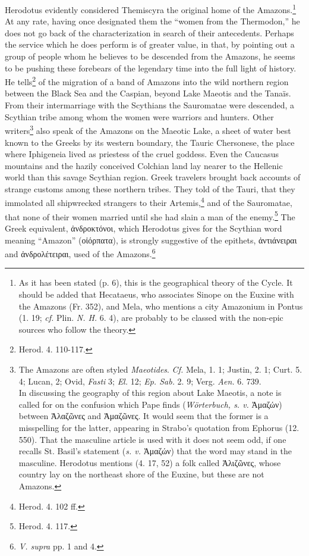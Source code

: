\documentclass[a4paper, 12pt, oneside]{article}
\begin{document}
Herodotus evidently considered Themiscyra the original home of the Amazons.\footnote{As it has been stated (p. 6), this is the geographical theory of the Cycle. It should be added that Hecataeus, who associates Sinope on the Euxine with the Amazons (Fr. 352), and Mela, who mentions a city Amazonium in Pontus (1. 19; \emph{cf.} Plin. \emph{N. H.} 6. 4), are probably to be classed with the non-epic sources who follow the theory.} At any rate, having once designated them the ``women from the Thermodon,'' he does not go back of the characterization in search of their antecedents. Perhaps the service which he does perform is of greater value, in that, by pointing out a group of people whom he believes to be descended from the Amazons, he seems to be pushing these forebears of the legendary time into the full light of history. He tells\footnote{Herod. 4. 110-117.} of the migration of a band of Amazons into the wild northern region between the Black Sea and the Caspian, beyond Lake Maeotis and the Tanaïs. From their intermarriage with the Scythians the Sauromatae were descended, a Scythian tribe among whom the women were warriors and hunters. Other writers\footnote{The Amazons are often styled \emph{Maeotides}. \emph{Cf.} Mela, 1. 1; Justin, 2. 1; Curt. 5. 4; Lucan, 2; Ovid, \emph{Fasti} 3; \emph{El.} 12; \emph{Ep. Sab.} 2. 9; Verg. \emph{Aen.} 6. 739.\\\hspace*{5mm}In discussing the geography of this region about Lake Maeotis, a note is called for on the confusion which Pape finds (\emph{Wörterbuch, s. v.} Ἀμαζών) between Ἀλαζῶνες and Ἀμαζῶνες. It would seem that the former is a misspelling for the latter, appearing in Strabo's quotation from Ephorus (12. 550). That the masculine article is used with it does not seem odd, if one recalls St. Basil's statement (\emph{s. v.} Ἀμαζών) that the word may stand in the masculine. Herodotus mentions (4. 17, 52) a folk called Ἀλιζῶνες, whose country lay on the northeast shore of the Euxine, but these are not Amazons.} also speak of the Amazons on the Maeotic Lake, a sheet of water best known to the Greeks by its western boundary, the Tauric Chersonese, the place where Iphigeneia lived as priestess of the cruel goddess. Even the Caucasus mountains and the hazily conceived Colchian land lay nearer to the Hellenic world than this savage Scythian region. Greek travelers brought back accounts of strange customs among these northern tribes. They told of the Tauri, that they immolated all shipwrecked strangers to their Artemis,\footnote{Herod. 4. 102 ff.} and of the Sauromatae, that none of their women married until she had slain a man of the enemy.\footnote{Herod. 4. 117.} The Greek equivalent, ἀνδροκτόνοι, which Herodotus gives for the Scythian word meaning ``Amazon'' (οἰόρπατα), is strongly suggestive of the epithets, ἀντιάνειραι and ἀνδρολέτειραι, used of the Amazons.\footnote{\emph{V. supra} pp. 1 and 4.}
\end{document}
